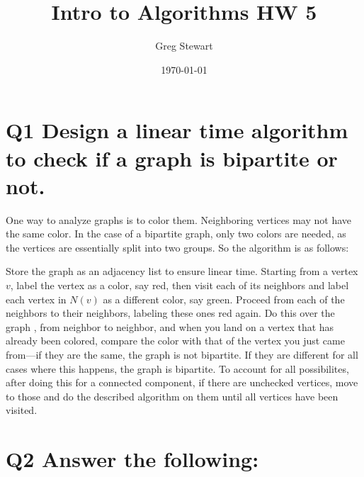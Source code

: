 \documentclass{article}
\title{Intro to Algorithms HW 5}
\author{Greg Stewart}
\date{\today}
\begin{document}
\maketitle

\section*{Q1 \normalsize Design a linear time algorithm to check if a graph is bipartite or not.}

One way to analyze graphs is to color them. Neighboring vertices may not have the same color. In the case of a bipartite graph, only two colors are needed, as the vertices are essentially split into two groups. So the algorithm is as follows:

Store the graph as an adjacency list to ensure linear time. Starting from a vertex $v$, label the vertex as a color, say red, then visit each of its neighbors and label each vertex in $N(v)$ as a different color, say green. Proceed from each of the neighbors to their neighbors, labeling these ones red again. Do this over the graph , from neighbor to neighbor, and when you land on a vertex that has already been colored, compare the color with that of the vertex you just came from---if they are the same, the graph is not bipartite. If they are different for all cases where this happens, the graph is bipartite. To account for all possibilites, after doing this for a connected component, if there are unchecked vertices, move to those and do the described algorithm on them until all vertices have been visited.  



\section*{Q2 \normalsize Answer the following:}
\end{document}
